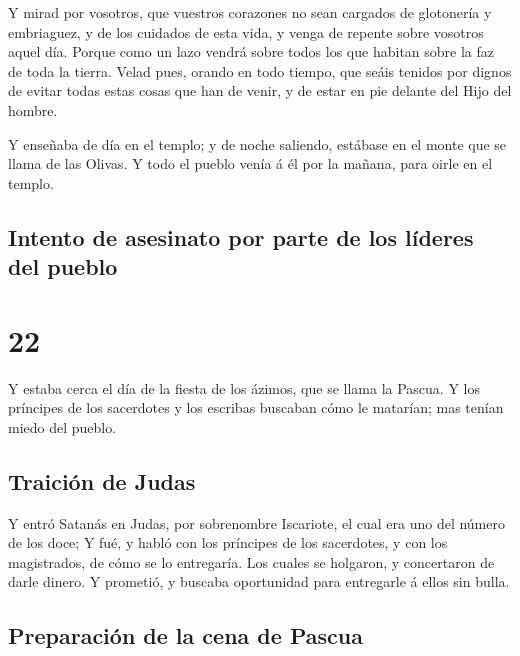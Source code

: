  Y mirad por vosotros, que vuestros corazones no sean
cargados de glotonería y embriaguez, y de los cuidados de esta vida, y
venga de repente sobre vosotros aquel día.  Porque como
un lazo vendrá sobre todos los que habitan sobre la faz de toda la
tierra.  Velad pues, orando en todo tiempo, que seáis
tenidos por dignos de evitar todas estas cosas que han de venir, y de
estar en pie delante del Hijo del hombre.

 Y enseñaba de día en el templo; y de noche saliendo,
estábase en el monte que se llama de las Olivas.  Y todo
el pueblo venía á él por la mañana, para oirle en el templo.

\hypertarget{intento-de-asesinato-por-parte-de-los-luxedderes-del-pueblo}{%
\subsection{Intento de asesinato por parte de los líderes del
pueblo}\label{intento-de-asesinato-por-parte-de-los-luxedderes-del-pueblo}}

\hypertarget{section-42-22}{%
\section{22}\label{section-42-22}}

 Y estaba cerca el día de la fiesta de los ázimos, que se
llama la Pascua.  Y los príncipes de los sacerdotes y los
escribas buscaban cómo le matarían; mas tenían miedo del pueblo.

\hypertarget{traiciuxf3n-de-judas}{%
\subsection{Traición de Judas}\label{traiciuxf3n-de-judas}}

 Y entró Satanás en Judas, por sobrenombre Iscariote, el
cual era uno del número de los doce;  Y fué, y habló con
los príncipes de los sacerdotes, y con los magistrados, de cómo se lo
entregaría.  Los cuales se holgaron, y concertaron de
darle dinero.  Y prometió, y buscaba oportunidad para
entregarle á ellos sin bulla.

\hypertarget{preparaciuxf3n-de-la-cena-de-pascua}{%
\subsection{Preparación de la cena de
Pascua}\label{preparaciuxf3n-de-la-cena-de-pascua}}

